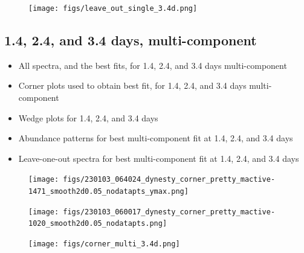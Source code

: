 \documentclass[twocolumn, twocolappendix]{aastex63}
\begin{document}
\begin{figure}[!ht]
    \texttt{[image: figs/leave\_out\_single\_3.4d.png]}
    \label{fig:leave_out_single_3.4d}
\end{figure}



\subsection{1.4, 2.4, and 3.4 days, multi-component}\label{ssc:1.4_2.4_3.4_multi_fits}


\begin{itemize}

    \item All spectra, and the best fits, for 1.4, 2.4, and 3.4 days multi-component
    
    \item Corner plots used to obtain best fit, for 1.4, 2.4, and 3.4 days multi-component
    
    \item Wedge plots for 1.4, 2.4, and 3.4 days
    
    \item Abundance patterns for best multi-component fit at 1.4, 2.4, and 3.4 days
    
    \item Leave-one-out spectra for best multi-component fit at 1.4, 2.4, and 3.4 days

\end{itemize}


\begin{figure}[!ht]
    \texttt{[image: figs/230103\_064024\_dynesty\_corner\_pretty\_mactive-1471\_smooth2d0.05\_nodatapts\_ymax.png]}
    \label{fig:corner_multi_1.4}
\end{figure}

\begin{figure}[!ht]
    \texttt{[image: figs/230103\_060017\_dynesty\_corner\_pretty\_mactive-1020\_smooth2d0.05\_nodatapts.png]}
    \label{fig:corner_multi_2.4}
\end{figure}

\begin{figure}[!ht]
    \texttt{[image: figs/corner\_multi\_3.4d.png]}
    \label{fig:corner_multi_3.4}
\end{figure}
\end{document}
